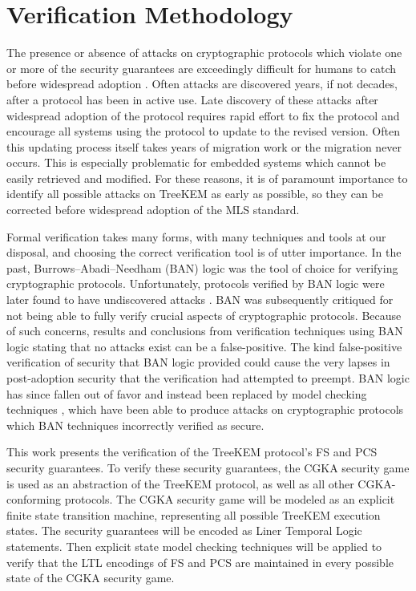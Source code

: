 \hypertarget{sec:methodology}{%
\chapter{Verification Methodology}\label{sec:methodology}}

The presence or absence of attacks on cryptographic protocols which violate one or more of the security guarantees are exceedingly difficult for humans to catch before widespread adoption \autocite{clark1997survey}.
Often attacks are discovered years, if not decades, after a protocol has been in active use.
Late discovery of these attacks after widespread adoption of the protocol requires rapid effort to fix the protocol and encourage all systems using the protocol to update to the revised version.
Often this updating process itself takes years of migration work or the migration never occurs.
This is especially problematic for embedded systems which cannot be easily retrieved and modified.
For these reasons, it is of paramount importance to identify all possible attacks on TreeKEM as early as possible, so they can be corrected before widespread adoption of the MLS standard.

Formal verification takes many forms, with many techniques and tools at our disposal, and choosing the correct verification tool is of utter importance.
In the past, Burrows--Abadi--Needham (BAN) \autocite{burrows1989logic} logic was the tool of choice for verifying cryptographic protocols.
Unfortunately, protocols verified by BAN logic were later found to have undiscovered attacks \autocite{10.5555/188307.188350}.
BAN was subsequently critiqued for not being able to fully verify crucial aspects of cryptographic protocols.
Because of such concerns, results and conclusions from verification techniques using BAN logic stating that no attacks exist can be a false-positive.
The kind false-positive verification of security that BAN logic provided could cause the very lapses in post-adoption security that the verification had attempted to preempt.
BAN logic has since fallen out of favor and instead been replaced by model checking techniques \autocite{marrero1997model}, which have been able to produce attacks on cryptographic protocols which BAN techniques incorrectly verified as secure.

This work presents the verification of the TreeKEM protocol's FS and PCS security guarantees.
To verify these security guarantees, the CGKA security game is used as an abstraction of the TreeKEM protocol, as well as all other CGKA-conforming protocols.
The CGKA security game will be modeled as an explicit finite state transition machine, representing all possible TreeKEM execution states.
The security guarantees will be encoded as Liner Temporal Logic statements.
Then explicit state model checking techniques will be applied to verify that the LTL encodings of FS and PCS are maintained in every possible state of the CGKA security game.

